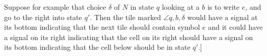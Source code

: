 \documentclass[12pt]{article}
\begin{document}
\begin{enumerate}
Suppose
for example that choice $\delta$ of $N$ in state $q$ looking at a $b$ is
to write $e$, and go to the right into state $q'$.  Then the tile marked
$\angle{q,b,\delta}$ would have a signal at its bottom indicating that the
next tile should contain symbol $e$ and it could have a signal on its right
indicating that the cell on its right should have a signal on its bottom
indicating that the cell below should be in state $q'$.]
\end{enumerate}
\end{document}
